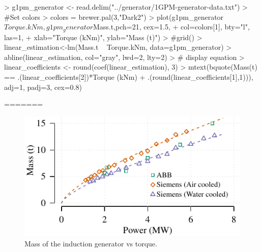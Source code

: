 \documentclass{article}
\begin{document}
\begin{Schunk}
\begin{Sinput}
> g1pm_generator <- read.delim("../generator/1GPM-generator-data.txt")
> #Set colors
> colors = brewer.pal(3,"Dark2")
> plot(g1pm_generator$Torque.kNm, g1pm_generator$Mass.t,pch=21, cex=1.5, 
+      col=colors[1], bty="l", las=1,
+      xlab="Torque (kNm)", ylab="Mass (t)")
> #grid()
> linear_estimation<-lm(Mass.t ~ Torque.kNm, data=g1pm_generator)
> abline(linear_estimation, col="gray", lwd=2, lty=2)
> # display equation
> linear_coefficients <- round(coef(linear_estimation), 3) 
> mtext(bquote(Mass(t) == .(linear_coefficients[2])*Torque (kNm) + .(round(linear_coefficients[1],1))), adj=1, padj=3, cex=0.8)
\end{Sinput}
\end{Schunk}
=======
\begin{knitrout}
\color{fgcolor}\begin{figure}[]

\includegraphics[width=\maxwidth]{figure/induction_generator} \caption[Mass of the induction generator vs torque]{Mass of the induction generator vs torque.\label{fig:induction_generator}}
\end{figure}


\end{knitrout}
\end{document}
